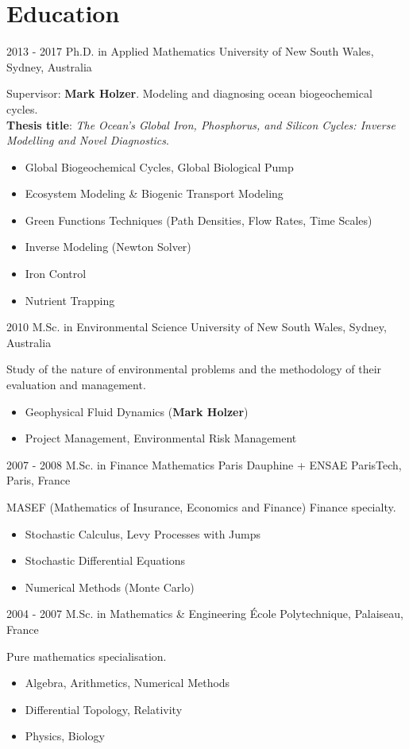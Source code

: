 \documentclass[]{friggeri-cv}
\begin{document}
\section{Education}
\begin{entrylist}
  \entry
    {2013 - 2017}
    {Ph.D. in Applied Mathematics}
    {University of New South Wales, Sydney, Australia}
    {Supervisor: \textbf{Mark Holzer}.
    Modeling and diagnosing ocean biogeochemical cycles.\\
    \textbf{Thesis title}: \emph{The Ocean's Global Iron, Phosphorus, and Silicon Cycles: Inverse Modelling and Novel Diagnostics}.
    \begin{itemize}
        \item Global Biogeochemical Cycles, Global Biological Pump
        \item Ecosystem Modeling \& Biogenic Transport Modeling
        \item Green Functions Techniques (Path Densities, Flow Rates, Time Scales)
        \item Inverse Modeling (Newton Solver)
        \item Iron Control
        \item Nutrient Trapping
    \end{itemize}
    }

  \entry
    {2010}
    {M.Sc. in Environmental Science}
    {University of New South Wales, Sydney, Australia}
    {Study of the nature of environmental problems and the methodology of their evaluation and management.
    \begin{itemize}
        \item Geophysical Fluid Dynamics (\textbf{Mark Holzer})
        \item Project Management, Environmental Risk Management
    \end{itemize}
    }

  \entry
    {2007 - 2008}
    {M.Sc. in Finance Mathematics}
    {Paris Dauphine + ENSAE ParisTech, Paris, France}
    {MASEF (Mathematics of Insurance, Economics and Finance) Finance specialty.
    \begin{itemize}
        \item Stochastic Calculus, Levy Processes with Jumps
        \item Stochastic Differential Equations
        \item Numerical Methods (Monte Carlo)
    \end{itemize}
    }

  \entry
    {2004 - 2007}
    {M.Sc. in Mathematics \& Engineering}
    {\'{E}cole Polytechnique, Palaiseau, France}
    {Pure mathematics specialisation.
    \begin{itemize}
        \item Algebra, Arithmetics, Numerical Methods
        \item Differential Topology, Relativity
        \item Physics, Biology
    \end{itemize}
    }


\end{entrylist}
\end{document}
